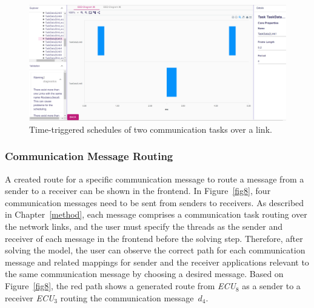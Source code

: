                 \begin{figure}[ht]
	    \centering
	    \includegraphics[width=0.9\columnwidth]{figures/schedule_link.PNG}
	    \caption{Time-triggered schedules of two communication tasks over a link.}
	    \label{fig11}
        \end{figure}
        \subsubsection{Communication Message Routing}
  
        A created route for a specific communication message to route a message from a sender to a receiver can be shown in the frontend. In Figure~\ref{fig8}, four communication messages need to be sent from senders to receivers. As described in Chapter~\ref{method}, each message comprises a communication task routing over the network links, and the user must specify the threads as the sender and receiver of each message in the frontend before the solving step. Therefore, after solving the model, the user can observe the correct path for each communication message and related mappings for sender and the receiver applications relevant to the same communication message by choosing a desired message. Based on Figure~\ref{fig8}, the red path shows a generated route from \textit{ECU}$_8$ as a sender to a receiver \textit{ECU}$_3$ routing the communication message~$d_4$.
        
